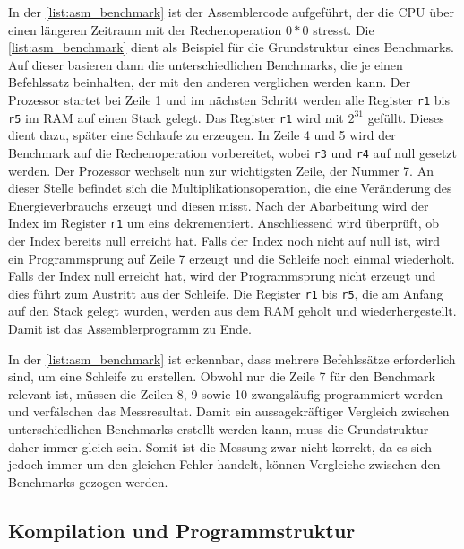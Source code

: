 In der \autoref{list:asm_benchmark} ist der Assemblercode aufgeführt, der die CPU über einen längeren Zeitraum mit der Rechenoperation $0*0$ stresst. Die \autoref{list:asm_benchmark} dient als Beispiel für die Grundstruktur eines Benchmarks. Auf dieser basieren dann die unterschiedlichen Benchmarks, die je einen Befehlssatz beinhalten, der mit den anderen verglichen werden kann. Der Prozessor startet bei Zeile 1 und im nächsten Schritt werden alle Register \texttt{r1} bis \texttt{r5} im RAM auf einen Stack gelegt. Das Register \texttt{r1} wird mit $2^{31}$ gefüllt. Dieses dient dazu, später eine Schlaufe zu erzeugen. In Zeile 4 und 5 wird der Benchmark auf die Rechenoperation vorbereitet, wobei \texttt{r3} und \texttt{r4} auf null gesetzt werden. Der Prozessor wechselt nun zur wichtigsten Zeile, der Nummer 7. An dieser Stelle befindet sich die Multiplikationsoperation, die eine Veränderung des Energieverbrauchs erzeugt und diesen misst. Nach der Abarbeitung wird der Index im Register \texttt{r1} um eins dekrementiert. Anschliessend wird überprüft, ob der Index bereits null erreicht hat. Falls der Index noch nicht auf null ist, wird ein Programmsprung auf Zeile 7 erzeugt und die Schleife noch einmal wiederholt. Falls der Index null erreicht hat, wird der Programmsprung nicht erzeugt und dies führt zum Austritt aus der Schleife. Die Register \texttt{r1} bis \texttt{r5}, die am Anfang auf den Stack gelegt wurden, werden aus dem RAM geholt und wiederhergestellt. Damit ist das Assemblerprogramm zu Ende.
\par
In der \autoref{list:asm_benchmark} ist erkennbar, dass mehrere Befehlssätze erforderlich sind, um eine Schleife zu erstellen. Obwohl nur die Zeile 7 für den Benchmark relevant ist, müssen die Zeilen 8, 9 sowie 10 zwangsläufig programmiert werden und verfälschen das Messresultat. Damit ein aussagekräftiger Vergleich zwischen unterschiedlichen Benchmarks erstellt werden kann, muss die Grundstruktur daher immer gleich sein. Somit ist die Messung zwar nicht korrekt, da es sich jedoch immer um den gleichen Fehler handelt, können Vergleiche zwischen den Benchmarks gezogen werden.

\pagebreak
\subsection{Kompilation und Programmstruktur}


